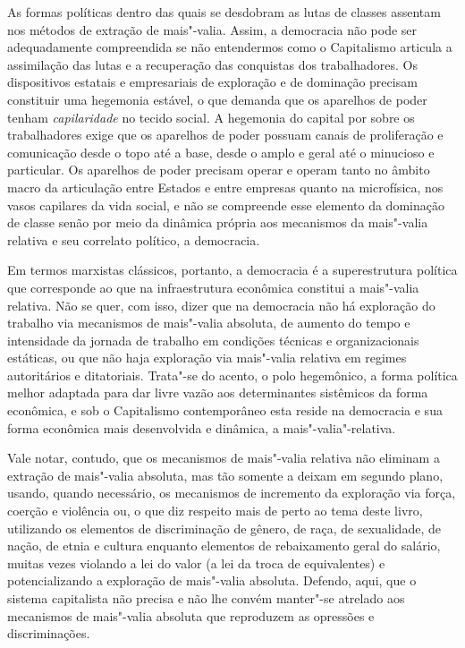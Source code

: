 As formas políticas dentro das quais se desdobram as lutas de classes
assentam nos métodos de extração de mais"-valia. Assim, a democracia não
pode ser adequadamente compreendida se não entendermos como o
Capitalismo articula a assimilação das lutas e a recuperação das
conquistas dos trabalhadores. Os dispositivos estatais e empresariais de
exploração e de dominação precisam constituir uma hegemonia estável, o
que demanda que os aparelhos de poder tenham \emph{capilaridade} no
tecido social. A hegemonia do capital por sobre os trabalhadores exige
que os aparelhos de poder possuam canais de proliferação e comunicação
desde o topo até a base, desde o amplo e geral até o minucioso e
particular. Os aparelhos de poder precisam operar e operam tanto no
âmbito macro da articulação entre Estados e entre empresas quanto na
microfísica, nos vasos capilares da vida social, e não se compreende
esse elemento da dominação de classe senão por meio da dinâmica própria
aos mecanismos da mais"-valia relativa e seu correlato político, a
democracia.

Em termos marxistas clássicos, portanto, a democracia é a superestrutura
política que corresponde ao que na infraestrutura econômica constitui a
mais"-valia relativa. Não se quer, com isso, dizer que na democracia não
há exploração do trabalho via mecanismos de mais"-valia absoluta, de
aumento do tempo e intensidade da jornada de trabalho em condições
técnicas e organizacionais estáticas, ou que não haja exploração via
mais"-valia relativa em regimes autoritários e ditatoriais. Trata"-se do
acento, o polo hegemônico, a forma política melhor adaptada para dar
livre vazão aos determinantes sistêmicos da forma econômica, e sob o
Capitalismo contemporâneo esta reside na democracia e sua forma
econômica mais desenvolvida e dinâmica, a mais"-valia"-relativa.

Vale notar, contudo, que os mecanismos de mais"-valia relativa não
eliminam a extração de mais"-valia absoluta, mas tão somente a deixam em
segundo plano, usando, quando necessário, os mecanismos de incremento da
exploração via força, coerção e violência ou, o que diz respeito mais de
perto ao tema deste livro, utilizando os elementos de discriminação de
gênero, de raça, de sexualidade, de nação, de etnia e cultura enquanto
elementos de rebaixamento geral do salário, muitas vezes violando a lei
do valor (a lei da troca de equivalentes) e potencializando a exploração
de mais"-valia absoluta. Defendo, aqui, que o sistema capitalista não
precisa e não lhe convém manter"-se atrelado aos mecanismos de mais"-valia
absoluta que reproduzem as opressões e discriminações.

